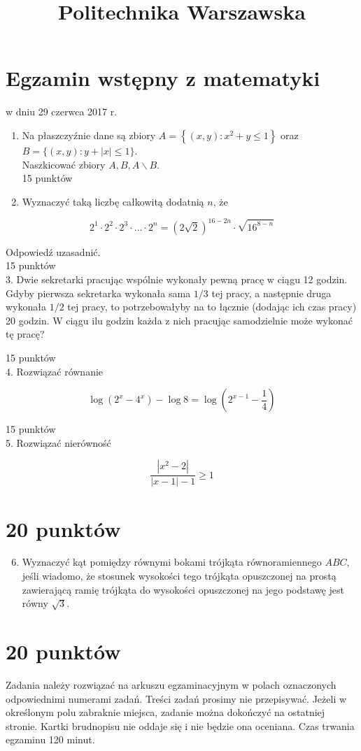 \documentclass[10pt]{article}
\title{Politechnika Warszawska }
\author{}
\date{}
\begin{document}
\maketitle
\section*{Egzamin wstępny z matematyki}
w dniu 29 czerwca 2017 r.

\begin{enumerate}
  \item Na płaszczyźnie dane są zbiory \(A=\left\{(x, y): x^{2}+y \leq 1\right\}\) oraz \(B=\{(x, y): y+|x| \leq 1\}\).\\
Naszkicować zbiory \(A, B, A \backslash B\).\\
15 punktów
  \item Wyznaczyć taką liczbę całkowitą dodatnią \(n\), że
\end{enumerate}

\[
2^{1} \cdot 2^{2} \cdot 2^{3} \cdot \ldots \cdot 2^{n}=(2 \sqrt{2})^{16-2 n} \cdot \sqrt{16^{8-n}}
\]

Odpowiedź uzasadnić.\\
15 punktów\\
3. Dwie sekretarki pracując wspólnie wykonały pewną pracę w ciągu 12 godzin. Gdyby pierwsza sekretarka wykonała sama \(1 / 3\) tej pracy, a następnie druga wykonała \(1 / 2\) tej pracy, to potrzebowałyby na to łącznie (dodając ich czas pracy) 20 godzin. W ciągu ilu godzin każda z nich pracując samodzielnie może wykonać tę pracę?

15 punktów\\
4. Rozwiązać równanie

\[
\log \left(2^{x}-4^{x}\right)-\log 8=\log \left(2^{x-1}-\frac{1}{4}\right)
\]

15 punktów\\
5. Rozwiązać nierówność

\[
\frac{\left|x^{2}-2\right|}{|x-1|-1} \geq 1
\]

\section*{20 punktów}
\begin{enumerate}
  \setcounter{enumi}{5}
  \item Wyznaczyć kąt pomiędzy równymi bokami trójkąta równoramiennego \(A B C\), jeśli wiadomo, że stosunek wysokości tego trójkąta opuszczonej na prostą zawierającą ramię trójkąta do wysokości opuszczonej na jego podstawę jest równy \(\sqrt{3}\).
\end{enumerate}

\section*{20 punktów}
Zadania należy rozwiązać na arkuszu egzaminacyjnym w polach oznaczonych odpowiednimi numerami zadań. Treści zadań prosimy nie przepisywać. Jeżeli w określonym polu zabraknie miejsca, zadanie można dokończyć na ostatniej stronie. Kartki brudnopisu nie oddaje się i nie będzie ona oceniana. Czas trwania egzaminu 120 minut.
\end{document}
